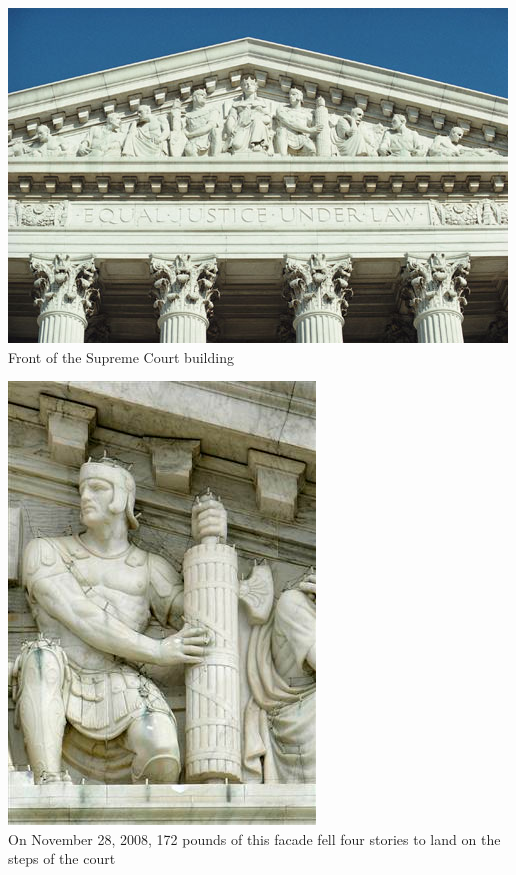 \begin{frame}
    \centering
    \includegraphics[width=.9\textwidth]{img/supremecourtfasces.jpg} \\
    \large{ Front of the Supreme Court building } \\
\end{frame}

\begin{frame}
    \centering
    \includegraphics[height=.85\textheight]{img/fasces_west_supcourt.jpg} \\
    \large{ On November 28, 2008, 172 pounds of this facade fell four stories to land on the steps of the court } \\
\end{frame}

